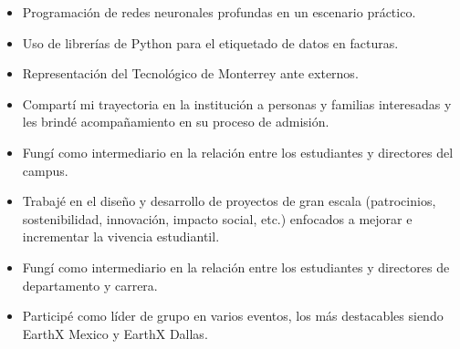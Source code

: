 \documentclass[10pt,a4paper,ragged2e]{altacv}
\begin{document}

\begin{fullwidth}
\makecvheader
\end{fullwidth}


\begin{itemize}
\item Programaci\'on de redes neuronales profundas en un escenario pr\'actico.
\item Uso de librer\'ias de Python para el etiquetado de datos en facturas.
\end{itemize}

\begin{itemize}
\item Representaci\'on del Tecnológico de Monterrey ante externos.
\item Compart\'i mi trayectoria en la instituci\'on a personas y familias interesadas y les brind\'e acompa\~namiento en su proceso de admisi\'on.
\end{itemize}
\divider

\begin{itemize}
\item Fung\'i como intermediario en la relaci\'on entre los estudiantes y directores del campus.
\item Trabaj\'e en el dise\~no y desarrollo de proyectos de gran escala (patrocinios, sostenibilidad, innovaci\'on, impacto social, etc.) enfocados a mejorar e incrementar la vivencia estudiantil.
\end{itemize}

\begin{itemize}
\item Fung\'i como intermediario en la relaci\'on entre los estudiantes y directores de departamento y carrera.
\item Particip\'e como l\'ider de grupo en varios eventos, los m\'as destacables siendo EarthX Mexico y EarthX Dallas.
\end{itemize}
\divider
\end{document}
